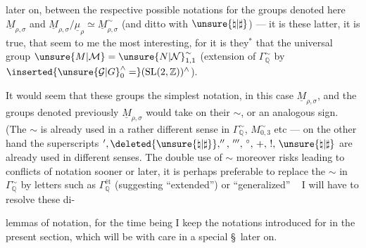 later on, between the respective possible notations
for the groups denoted here
$\underline M_{\rho,\sigma}$ and
$\underline M_{\rho,\sigma}/\underline\mu_\rho\simeq
\underline M_{\rho,\sigma}^{\sim}$
(and ditto with $\unsure{\natural|\sharp}$)
--- it is these latter, it is true, that seem to me the most interesting,
for it is they$^{*}$ that  the universal group
$\unsure{M|\mathcal M}=\unsure{N|\mathcal N}_{1,1}^{\sim}$
(extension of $\Gamma_{\mathbb Q}^{\sim}$ by
$\inserted{\unsure{\mathcal G|G}_{0}^{\wedge}=}
(\mathrm{SL}(2,\mathbb Z))^{\wedge}$).

It would seem that these groups  the simplest notation,
in this case $\underline M_{\rho,\sigma}$, and the groups denoted
previously $\underline M_{\rho,\sigma}$ would take on their $\sim$,
or an analogous sign. (The $\sim$ is already used in a rather
different sense in $\Gamma_{\mathbb Q}^{\sim}$,
$M_{0,3}^{\sim}$ etc --- on the other hand the superscripts
$',\deleted{\unsure{\natural|\sharp}},'',\,''',\,{}^{\circ},\,+,\,!,\,
\unsure{\natural|\sharp}$
are already used in different senses.
The double use of $\sim$ moreover risks leading to conflicts of
notation sooner or later, it is perhaps preferable to replace the $\sim$
in $\Gamma_{\mathbb Q}^{\sim}$ by letters such as
$\Gamma_{\mathbb Q}^{\text{ét}}$
(suggesting ``extended'') or 
``generalized'' \ 
I will have to resolve these di-

lemmas of notation, for the time being I keep the notations introduced for
 in the present section, which will be
 with care in a special \S\ later on.

